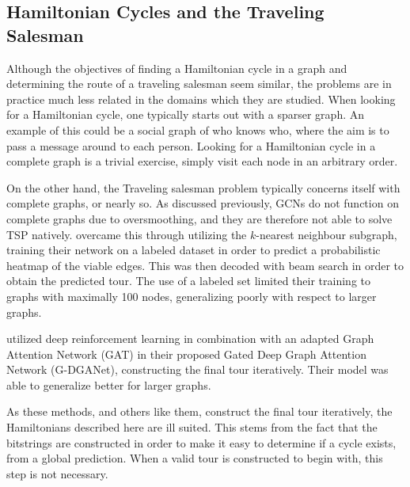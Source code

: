 \subsection{Hamiltonian Cycles and the Traveling Salesman}
Although the objectives of finding a Hamiltonian cycle in a graph and determining the route of a traveling salesman seem similar, the problems are in practice much less related in the domains which they are studied.
When looking for a Hamiltonian cycle, one typically starts out with a sparser graph.
An example of this could be a social graph of who knows who, where the aim is to pass a message around to each person.
Looking for a Hamiltonian cycle in a complete graph is a trivial exercise, simply visit each node in an arbitrary order.

On the other hand, the Traveling salesman problem typically concerns itself with complete graphs, or nearly so.
As discussed previously, GCNs do not function on complete graphs due to oversmoothing, and they are therefore not able to solve TSP natively.
\textcite{joshi2019efficient} overcame this through utilizing the $k$-nearest neighbour subgraph, training their network on a labeled dataset in order to predict a probabilistic heatmap of the viable edges.
This was then decoded with beam search in order to obtain the predicted tour.
The use of a labeled set limited their training to graphs with maximally 100 nodes, generalizing poorly with respect to larger graphs.

\textcite{FELLEK2024127392} utilized deep reinforcement learning in combination with an adapted Graph Attention Network (GAT) in their proposed Gated Deep Graph Attention Network (G-DGANet), constructing the final tour iteratively.
Their model was able to generalize better for larger graphs.

As these methods, and others like them, construct the final tour iteratively, the Hamiltonians described here are ill suited.
This stems from the fact that the bitstrings are constructed in order to make it easy to determine if a cycle exists, from a global prediction.
When a valid tour is constructed to begin with, this step is not necessary.

